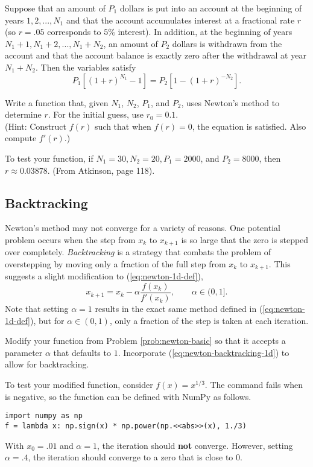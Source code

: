 \begin{problem} %
\label{prob:newton-interest}
Suppose that an amount of $P_1$ dollars is put into an account at the beginning of years $1, 2,..., N_1$ and that the account accumulates interest at a fractional rate $r$ (so $r = .05$ corresponds to $5\%$ interest).
In addition, at the beginning of years $N_1 + 1, N_1 + 2, ..., N_1 + N_2$, an amount of $P_2$ dollars is withdrawn from the account and that the account balance is exactly zero after the withdrawal at year $N_1 + N_2$.
Then the variables satisfy
\[
P_1[(1+r)^{N_1} - 1] = P_2[1-(1+r)^{-N_2}].
\]

Write a function that, given $N_1$, $N_2$, $P_1$, and $P_2$, uses Newton's method to determine $r$.
For the initial guess, use $r_0 = 0.1$.
\\(Hint: Construct $f(r)$ such that when $f(r)=0$, the equation is satisfied.
Also compute $f'(r)$.)

To test your function, if $N_1 =30, N_2 =20, P_1 =2000$, and $P_2 =8000$, then $r\approx 0.03878$.
(From Atkinson, page 118). %
\end{problem}

\subsection*{Backtracking} %

Newton's method may not converge for a variety of reasons.
One potential problem occurs when the step from $x_k$ to $x_{k+1}$ is so large that the zero is stepped over completely.
\emph{Backtracking} is a strategy that combats the problem of overstepping by moving only a fraction of the full step from $x_k$ to $x_{k+1}$.
This suggests a slight modification to (\ref{eq:newton-1d-def}),
\begin{equation}
x_{k+1} = x_k - \alpha\frac{f(x_k)}{f'(x_k)},\qquad\alpha\in(0,1].
\label{eq:newton-backtracking-1d}
\end{equation}
Note that setting $\alpha = 1$ results in the exact same method defined in (\ref{eq:newton-1d-def}), but for $\alpha \in (0,1)$, only a fraction of the step is taken at each iteration.

\begin{problem} %
Modify your function from Problem \ref{prob:newton-basic} so that it accepts a parameter $\alpha$ that defaults to $1$.
Incorporate (\ref{eq:newton-backtracking-1d}) to allow for backtracking.

To test your modified function, consider $f(x)=x^{1/3}$.
The command  fails when  is negative, so the function can be defined with NumPy as follows.
\begin{lstlisting}
import numpy as np
f = lambda x: np.sign(x) * np.power(np.<<abs>>(x), 1./3)
\end{lstlisting}
With $x_0=.01$ and $\alpha=1$, the iteration should \textbf{not} converge.
However, setting $\alpha=.4$, the iteration should converge to a zero that is close to $0$.
\label{prob:newton-1d-backtracking}
\end{problem}

